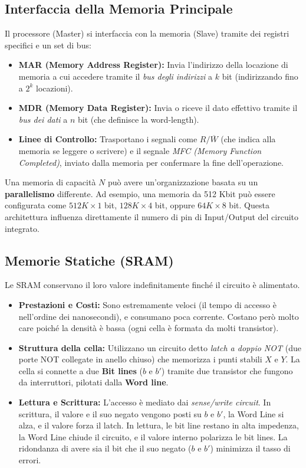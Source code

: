 \documentclass[12pt, a4paper]{article}
\begin{document}
\subsection{Interfaccia della Memoria Principale}
Il processore (Master) si interfaccia con la memoria (Slave) tramite dei registri specifici e un set di bus:
\begin{itemize}
    \item \textbf{MAR (Memory Address Register):} Invia l'indirizzo della locazione di memoria a cui accedere tramite il \textit{bus degli indirizzi} a $k$ bit (indirizzando fino a $2^k$ locazioni).
    \item \textbf{MDR (Memory Data Register):} Invia o riceve il dato effettivo tramite il \textit{bus dei dati} a $n$ bit (che definisce la word-length).
    \item \textbf{Linee di Controllo:} Trasportano i segnali come $R/\overline{W}$ (che indica alla memoria se leggere o scrivere) e il segnale \textit{MFC (Memory Function Completed)}, inviato dalla memoria per confermare la fine dell'operazione.
\end{itemize}
Una memoria di capacità $N$ può avere un'organizzazione basata su un \textbf{parallelismo} differente. Ad esempio, una memoria da 512 Kbit può essere configurata come $512K \times 1$ bit, $128K \times 4$ bit, oppure $64K \times 8$ bit. Questa architettura influenza direttamente il numero di pin di Input/Output del circuito integrato.

\subsection{Memorie Statiche (SRAM)}
Le SRAM conservano il loro valore indefinitamente finché il circuito è alimentato.
\begin{itemize}
    \item \textbf{Prestazioni e Costi:} Sono estremamente veloci (il tempo di accesso è nell'ordine dei nanosecondi), e consumano poca corrente. Costano però molto care poiché la densità è bassa (ogni cella è formata da molti transistor).
    \item \textbf{Struttura della cella:} Utilizzano un circuito detto \textit{latch a doppio NOT} (due porte NOT collegate in anello chiuso) che memorizza i punti stabili $X$ e $Y$. La cella si connette a due \textbf{Bit lines} ($b$ e $b'$) tramite due transistor che fungono da interruttori, pilotati dalla \textbf{Word line}.
    \item \textbf{Lettura e Scrittura:} L'accesso è mediato dai \textit{sense/write circuit}. In scrittura, il valore e il suo negato vengono posti su $b$ e $b'$, la Word Line si alza, e il valore forza il latch. In lettura, le bit line restano in alta impedenza, la Word Line chiude il circuito, e il valore interno polarizza le bit lines. La ridondanza di avere sia il bit che il suo negato ($b$ e $b'$) minimizza il tasso di errori.
\end{itemize}
\end{document}
